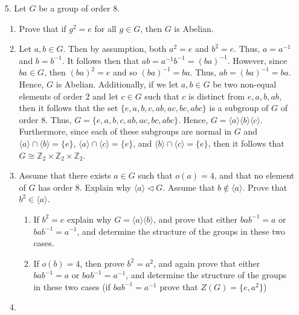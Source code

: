 \documentclass[12pt]{article}
\makeatletter
\theoremstyle{definition}
\theoremstyle{remark}
\renewenvironment{proof}[1][\proofname]{\par
  \pushQED{\qed}%
  \normalfont \topsep6\p@\@plus6\p@\relax
  \list{}{\leftmargin=0mm
          \rightmargin=4mm
          \settowidth{\itemindent}{\itshape#1}%
          \labelwidth=\itemindent
          \parsep=0pt \listparindent=\parindent 
  }
  \item[\hskip\labelsep
        \itshape
    #1\@addpunct{.}]\ignorespaces
}{%
  \popQED\endlist\@endpefalse
}
\let\oldproofname=\proofname
\renewcommand{\proofname}{\bf{\textit{\oldproofname}}}
\makeatother
\begin{document}
\begin{enumerate}[leftmargin=*]
        \item[5.] Let $G$ be a group of order 8.\par\hfill
            \begin{enumerate}[label=(\alph*)]
                \item Prove that if $g^2=e$ for all $g\in G$, then $G$ is Abelian.
                    \begin{proof}
                        Let $a,b\in G$. Then by assumption, both $a^2=e$ and $b^2=e$. Thus, $a=a^{-1}$ and $b=b^{-1}$. It follows then that $ab=a^{-1}b^{-1}=(ba)^{-1}$. However, since $ba\in G$, then $(ba)^2=e$ and so $(ba)^{-1}=ba$. Thus, $ab=(ba)^{-1}=ba$. Hence, $G$ is Abelian. Additionally, if we let $a,b\in G$ be two non-equal elements of order 2 and let $c\in G$ such that $c$ is distinct from $e,a,b,ab$, then it follows that the set $\{e,a,b,c,ab,ac,bc,abc\}$ is a subgroup of $G$ of order 8. Thus, $G=\{e,a,b,c,ab,ac,bc,abc\}$. Hence,  $G=\langle a\rangle\langle b\rangle\langle c\rangle$. Furthermore, since each of these subgroups are normal in $G$ and $\langle a\rangle\cap\langle b\rangle=\{e\}$, $\langle a\rangle\cap\langle c\rangle=\{e\}$, and $\langle b\rangle\cap\langle c\rangle=\{e\}$, then it follows that $G\cong\mathbb{Z}_2\times\mathbb{Z}_2\times\mathbb{Z}_2$.
                    \end{proof}
                \item Assume that there exists $a\in G$ such that $o(a)=4$, and that no element of $G$ has order 8. Explain why $\langle a\rangle\triangleleft G$. Assume that $b\notin\langle a\rangle$. Prove that $b^2\in\langle a\rangle$.
                    \begin{enumerate}[label=(\roman*)]
                        \item If $b^2=e$ explain why $G=\langle a\rangle\langle b\rangle$, and prove that either $bab^{-1}=a$ or $bab^{-1}=a^{-1}$, and determine the structure of the groups in these two cases. 
                        \item If $o(b)=4$, then prove $b^2=a^2$, and again prove that either $bab^{-1}=a$ or $bab^{-1}=a^{-1}$, and determine the structure of the groups in these two cases (if $bab^{-1}=a^{-1}$ prove that $Z(G)=\{e,a^2\}$)
                    \end{enumerate}
                    \begin{proof}

\end{proof}
\end{enumerate}
\end{enumerate}
\end{document}
